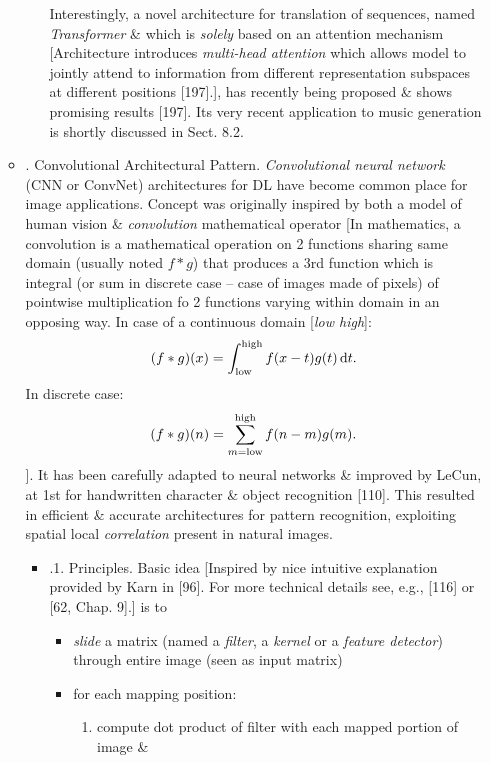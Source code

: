 \documentclass{article}
\begin{document}
\begin{itemize}
\begin{itemize}
\begin{itemize}
			Interestingly, a novel architecture for translation of sequences, named {\it Transformer} \& which is {\it solely} based on an attention mechanism [Architecture introduces {\it multi-head attention} which allows model to jointly attend to information from different representation subspaces at different positions [197].], has recently being proposed \& shows promising results [197]. Its very recent application to music generation is shortly discussed in Sect. 8.2.
		\end{itemize}		
		\item {. Convolutional Architectural Pattern.} {\it Convolutional neural network} (CNN or ConvNet) architectures for DL have become common place for image applications. Concept was originally inspired by both a model of human vision \& {\it convolution} mathematical operator [In mathematics, a convolution is a mathematical operation on 2 functions sharing same domain (usually noted $f*g$) that produces a 3rd function which is integral (or sum in discrete case -- case of images made of pixels) of pointwise multiplication fo 2 functions varying within domain in an opposing way. In case of a continuous domain [{\it low high}]:
		\begin{equation*}
			(f*g)(x) = \int_{\rm low}^{\rm high} f(x - t)g(t)\,{\rm d}t.
		\end{equation*}
		In discrete case:
		\begin{equation*}
			(f*g)(n) = \sum_{m = {\rm low}}^{\rm high} f(n - m)g(m).
		\end{equation*}
		]. It has been carefully adapted to neural networks \& improved by {\sc LeCun}, at 1st for handwritten character \& object recognition [110]. This resulted in efficient \& accurate architectures for pattern recognition, exploiting spatial local {\it correlation} present in natural images.
		\begin{itemize}
			\item {.1. Principles.} Basic idea [Inspired by nice intuitive explanation provided by {\sc Karn} in [96]. For more technical details see, e.g., [116] or [62, Chap. 9].] is to
			\begin{itemize}
				\item {\it slide} a matrix (named a {\it filter}, a {\it kernel} or a {\it feature detector}) through entire image (seen as input matrix)
				\item for each mapping position:
				\begin{enumerate}
					\item compute dot product of filter with each mapped portion of image \&

\end{enumerate}
\end{itemize}
\end{itemize}
\end{itemize}
\end{itemize}
\end{document}
